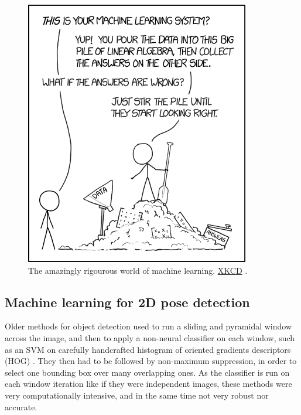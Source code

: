 \begin{figure}[hbtp]
	\centering
	\def\svgwidth{1\columnwidth}
	\fontsize{10pt}{10pt}\selectfont
	\includegraphics[width=0.4\linewidth]{"../Chap2/Figures/Fig_XKCD.png"}
	\caption{The amazingly rigourous world of machine learning. \href{https://xkcd.com/1838/}{XKCD} .} 
	\label{fig_xkcd}
\end{figure}


\subsection{Machine learning for 2D pose detection}\label{sec:Machine learning for 2D pose detection}

Older methods for object detection used to run a sliding and pyramidal window across the image, and then to apply a non-neural classifier on each window, such as an SVM on carefully handcrafted histogram of oriented gradients descriptors (HOG) \cite{Dalal2005}. They then had to be followed by non-maximum suppression, in order to select one bounding box over many overlapping ones. As the classifier is run on each window iteration like if they were independent images, these methods were very computationally intensive, and in the same time not very robust nor accurate. 

